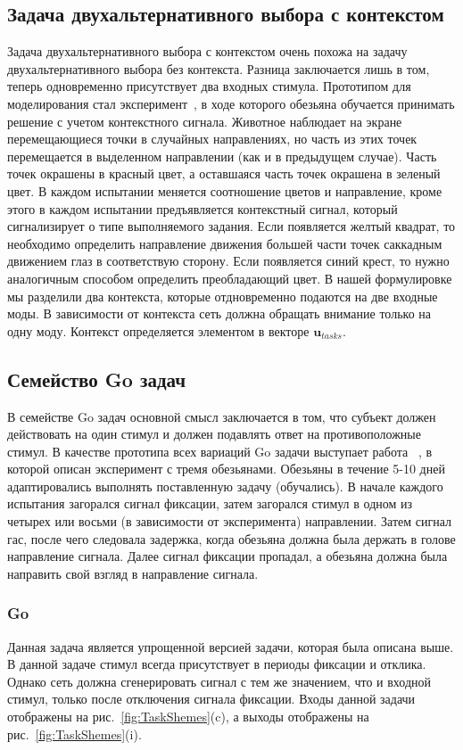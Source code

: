 \documentclass{article}
\begin{document}
\subsection{Задача двухальтернативного выбора с контекстом}
Задача двухальтернативного выбора с контекстом очень похожа на задачу двухальтернативного выбора без контекста. Разница заключается лишь в том, теперь одновременно присутствует два входных стимула. Прототипом для моделирования стал эксперимент~\cite{mante2013context}, в ходе которого обезьяна обучается принимать решение с учетом контекстного сигнала. Животное наблюдает на экране перемещающиеся точки в случайных направлениях, но часть из этих точек перемещается в выделенном направлении (как и в предыдущем случае). Часть точек окрашены в красный цвет, а оставшаяся часть точек окрашена в зеленый цвет. В каждом испытании меняется соотношение цветов и направление, кроме этого в каждом испытании предъявляется контекстный сигнал, который сигнализирует о типе выполняемого задания. Если появляется желтый квадрат, то необходимо определить направление движения большей части точек саккадным движением глаз в соответствую сторону. Если появляется синий крест, то нужно аналогичным способом определить преобладающий цвет. В нашей формулировке мы разделили два контекста, которые отдновременно подаются на две входные моды. В зависимости от контекста сеть должна обращать внимание только на одну моду. Контекст определяется элементом в векторе $\mathbf{u}_{tasks}$.
\subsection{Семейство Go задач}\label{label:goFamily}
В семействе Go задач основной смысл заключается в том, что субъект должен действовать на один стимул и должен подавлять ответ на противоположные стимул. В качестве прототипа всех вариаций Go задачи выступает работа ~\cite{funahashi1989mnemonic}, в которой описан эксперимент с тремя обезьянами. Обезьяны в течение 5-10 дней адаптировались выполнять поставленную задачу (обучались). В начале каждого испытания загорался сигнал фиксации, затем загорался стимул в одном из четырех или восьми (в зависимости от эксперимента) направлении. Затем сигнал гас, после чего следовала задержка, когда обезьяна должна была держать в голове направление сигнала. Далее сигнал фиксации пропадал, а обезьяна должна была направить свой взгляд в направление сигнала.
\subsubsection{Go}
Данная задача является упрощенной версией задачи, которая была описана выше. В данной задаче стимул всегда присутствует в периоды фиксации и отклика. Однако сеть должна сгенерировать сигнал с тем же значением, что и входной стимул, только после отключения сигнала фиксации. Входы данной задачи отображены на рис.~\ref{fig:TaskShemes}(c), а выходы отображены на рис.~\ref{fig:TaskShemes}(i).
\end{document}
